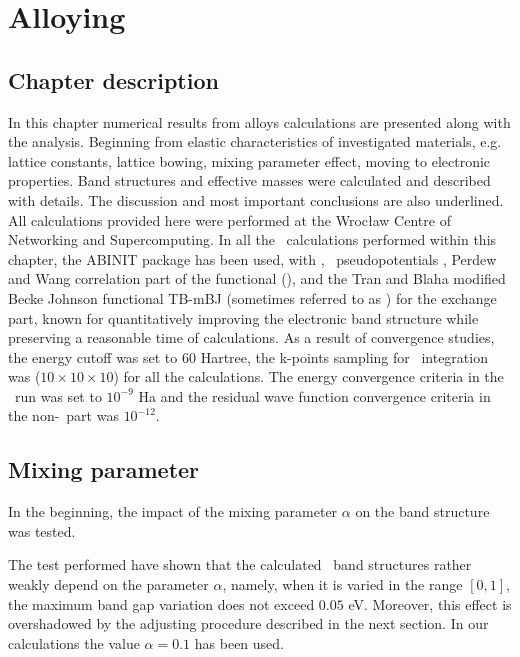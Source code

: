 \chapter{Alloying}
\label{chap:alloying}

\section*{Chapter description}

In this chapter numerical results from alloys calculations are presented along with the analysis.
Beginning from elastic characteristics of investigated materials, e.g. lattice constants, lattice bowing, mixing parameter effect, moving to electronic properties.
Band structures and effective masses were calculated and described with details.
The discussion and most important conclusions are also underlined.
All calculations provided here were performed at the Wrocław Centre of Networking and Supercomputing.
In all the \abinitio\ calculations performed within this chapter, the ABINIT package \cite{abinit1} has been used, with \LDA, \HGH\ pseudopotentials \cite{abinit2, hgh}, Perdew and Wang correlation part of the functional \cite{pw} (\PAW), and the Tran and Blaha modified Becke Johnson functional TB-mBJ (sometimes referred to as \mBJLDA) \cite{tbtb} for the exchange part, known for quantitatively improving the electronic band structure while preserving a reasonable time of calculations.
As a result of convergence studies, the energy cutoff was set to $60$ Hartree, the k-points sampling for \BZ\ integration was ($10\times 10\times 10$) for all the calculations.
The energy convergence criteria in the \SC\ run was set to $10^{-9}$ Ha and the residual wave function convergence criteria in the non-\SC\ part was $10^{-12}$.
\ornament

\section{Mixing parameter}

In the beginning, the impact of the mixing parameter $\alpha$ on the band structure was tested.


The test performed have shown that the calculated \SC\ band structures rather weakly depend on the parameter $\alpha$, namely, when it is varied in the range $[0,1]$, the maximum band gap variation does not exceed $0.05$ eV.
Moreover, this effect is overshadowed by the adjusting procedure described in the next section.
In our calculations the value $\alpha=0.1$ has been used.


